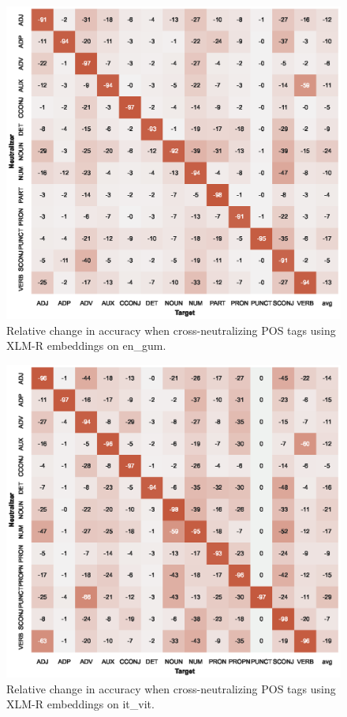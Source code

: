\documentclass[11pt,a4paper]{article}
\begin{document}
\begin{figure}[t]
    \centering
    \includegraphics{full_figures/POS_xlm-roberta-base_en_gum_acc_drop_agg=max_probe=9.eps}
    \caption{Relative change in accuracy when cross-neutralizing POS tags using XLM-R embeddings on en\_gum.}
    \label{fig:xneutr_xlm_pos_en_complete}
\end{figure}

\begin{figure}[t]
    \centering
    \includegraphics{full_figures/POS_xlm-roberta-base_it_vit_acc_drop_agg=first_probe=9.eps}
    \caption{Relative change in accuracy when cross-neutralizing POS tags using XLM-R embeddings on it\_vit.}
    \label{fig:xneutr_xlm_pos_it_complete}
\end{figure}
\end{document}
